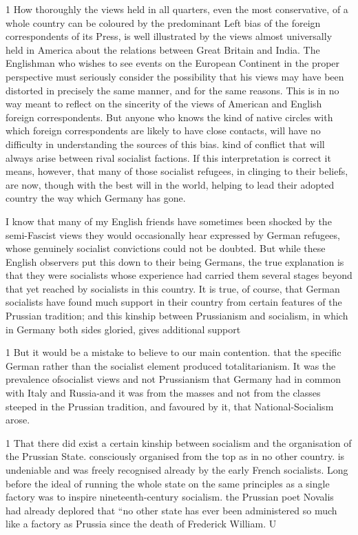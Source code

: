 \documentclass[11pt,openany]{book}
\begin{document}
1 How thoroughly the views held in all quarters, even the most conservative, of a whole country can be coloured by the predominant Left bias of the foreign correspondents of its Press, is well illustrated by the views almost universally held in America about the relations between Great Britain and India. The Englishman who wishes to see events on the European Continent in the proper perspective must seriously consider the possibility that his views may have been distorted in precisely the same manner, and for the same reasons. This is in no way meant to reflect on the sincerity of the views of American and English foreign correspondents. But anyone who knows the kind of native circles with which foreign correspondents are likely to have close contacts, will have no difficulty in understanding the sources of this bias. kind of conflict that will always arise between rival socialist factions. If this interpretation is correct it means, however, that many of those socialist refugees, in clinging to their beliefs, are now, though with the best will in the world, helping to lead their adopted country the way which Germany has gone.

I know that many of my English friends have sometimes been shocked by the semi-Fascist views they would occasionally hear expressed by German refugees, whose genuinely socialist convictions could not be doubted. But while these English observers put this down to their being Germans, the true explanation is that they were socialists whose experience had carried them several stages beyond that yet reached by socialists in this country. It is true, of course, that German socialists have found much support in their country from certain features of the Prussian tradition; and this kinship between Prussianism and socialism, in which in Germany both sides gloried, gives additional support

1 But it would be a mistake to believe to our main contention. that the specific German rather than the socialist element produced totalitarianism. It was the prevalence ofsocialist views and not Prussianism that Germany had in common with Italy and Russia-and it was from the masses and not from the classes steeped in the Prussian tradition, and favoured by it, that National-Socialism arose.

1 That there did exist a certain kinship between socialism and the organisation of the Prussian State. consciously organised from the top as in no other country. is undeniable and was freely recognised already by the early French socialists. Long before the ideal of running the whole state on the same principles as a single factory was to inspire nineteenth-century socialism. the Prussian poet Novalis had already deplored that ``no other state has ever been administered so much like a factory as Prussia since the death of Frederick William. U
\end{document}
